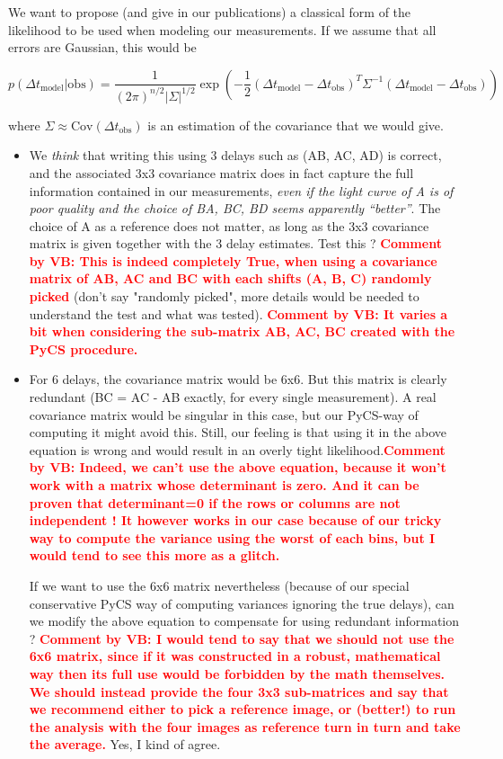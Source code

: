 \documentclass[11pt]{scrartcl}
\newcommand{\com}[2]{\xspace\textcolor{red}{\textbf{Comment by #1: #2}}}
\newcommand{\dt}[1]{\ensuremath{\Delta t_{\mathrm{#1}}}\xspace}
\begin{document}
We want to propose (and give in our publications) a classical form of the likelihood to be used when modeling our measurements. If we assume that all errors are Gaussian, this would be

\begin{equation}
p(\dt{model} | \mathrm{obs}) = \frac{1}{(2 \pi)^{n/2} |\Sigma|^{1/2}}\exp\left( -\frac{1}{2} (\dt{model}-\dt{obs})^T\Sigma^{-1}(\dt{model}-\dt{obs}) \right)
\end{equation}

where $\Sigma \approx \textrm{Cov}(\dt{obs})$ is an estimation of the covariance that we would give.

\begin{itemize}
\item We \emph{think} that writing this using 3 delays such as (AB, AC, 
AD) is correct, and the associated 3x3 covariance matrix does in fact 
capture the full information contained in our measurements, \emph{even 
if the light curve of A is of poor quality and the choice of BA, BC, BD 
seems apparently ``better''}. The choice of A as a reference does not 
matter, as long as the 3x3 covariance matrix is given together with the 
3 delay estimates. Test this ? \com{VB}{This is indeed completely True, 
when using a covariance matrix of AB, AC and BC with each shifts (A, B, 
C) randomly picked} (don't say "randomly picked", more details would be needed to understand the test and what was tested). \com{VB}{It varies a bit when considering the sub-matrix AB, 
AC, BC created with the PyCS procedure.}


\item For 6 delays, the covariance matrix would be 6x6. But this matrix 
is clearly redundant (BC = AC - AB exactly, for every single 
measurement). A real covariance matrix would be singular in this case, but our PyCS-way of computing it might avoid this. Still, our feeling is that 
using it in the above equation is wrong and would result in an overly 
tight likelihood.\com{VB}{Indeed, we can't use the above equation, 
because it {\textbf won't} work with a matrix whose determinant is 
zero. And it can be proven that determinant=0 if the rows or columns are 
not independent ! It however works in our case because of our tricky way 
to compute the variance using the worst of each bins, but I would tend 
to see this more as a glitch.}


If we want to use the 6x6 matrix nevertheless (because of our special 
conservative PyCS way of computing variances ignoring the true delays), 
can we modify the above equation to compensate for using redundant 
information ? \com{VB}{I would tend to say that we should not use the 
6x6 matrix, since if it was constructed in a robust, mathematical way 
then its full use would be forbidden by the math themselves. We should 
instead provide the four 3x3 sub-matrices and say that we recommend 
either to pick a reference image, or (better!) to run the analysis with 
the four images as reference turn in turn and take the average.}
Yes, I kind of agree.

\end{itemize}
\newpage
\end{document}
